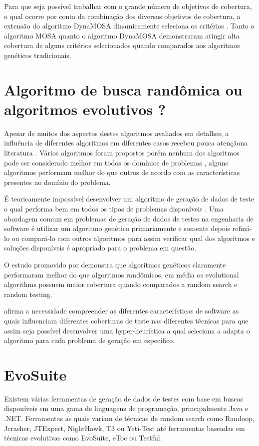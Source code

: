\documentclass[
	12pt,				%
	oneside,			%
	a4paper,			%
	english,			%
	brazil				%
	]{abntex2ppgsi}
\begin{document}
Para que seja possível trabalhar com o grande número de objetivos de cobertura, o qual ocorre por conta da combinação dos diversos objetivos de cobertura, a extensão  do algoritmo DynaMOSA dinamicamente seleciona  os critérios  \cite{Campos2017}. Tanto o algoritmo MOSA quanto o algoritmo DynaMOSA demonstraram atingir alta cobertura de alguns critérios selecionados quando comparados aos algoritmos genéticos tradicionais. \cite{Campos2017}

\section{Algoritmo de busca randômica ou algoritmos evolutivos ?}
Apesar de muitos dos aspectos destes algoritmos avaliados em detalhes, a influência de diferentes algoritmos em diferentes casos recebeu pouca atençãona literatura \cite{Campos2017}. Vários algoritmos foram propostos porém nenhum dos algoritmos pode ser considerado melhor em todos os domínios de problemas , alguns algoritmos performam melhor do que outros de acordo com as características presentes no domínio do problema. \cite{Campos2017}


É teoricamente impossível desenvolver um algoritmo de geração de dados de teste o qual performa bem em todos os tipos de problemas disponíveis \cite{Campos2017}. Uma abordagem comum em problemas de geração de dados de testes na engenharia de software é utilizar um algoritmo genético primariamente e somente depois refiná-lo ou compará-lo com outros algoritmos para assim verificar qual dos algoritmos e soluções disponíveis  é apropriado para o problema em questão. \cite{Campos2017}

O estudo promovido por \cite{Campos2017} demonstra que algoritmos genéticos claramente performaram melhor do que algoritmos randômicos, em média os evolutional algorithms possuem maior cobertura quando comparados a random search e random testing. \cite{Campos2017}

\cite{Campos2017} afirma a necessidade compreender as diferentes características de software as quais influenciam diferentes coberturas de teste nas diferentes técnicas para que assim seja possível desenvolver uma hyper-heurística a qual seleciona a adapta o algoritmo para cada problema de geração em específico.

\section{EvoSuite}
Existem várias ferramentas de geração de dados de testes com base em buscas disponíveis em uma gama de linguagens de programação, principalmente Java e .NET. Ferramentas as quais variam de técnicas de random search como Randoop, Jcrasher, JTExpert, NightHawk, T3 ou Yeti-Test até ferramentas baseadas em técnicas evolutivas como EvoSuite, eToc ou Testful. \cite{shamriski20151115}
\end{document}

